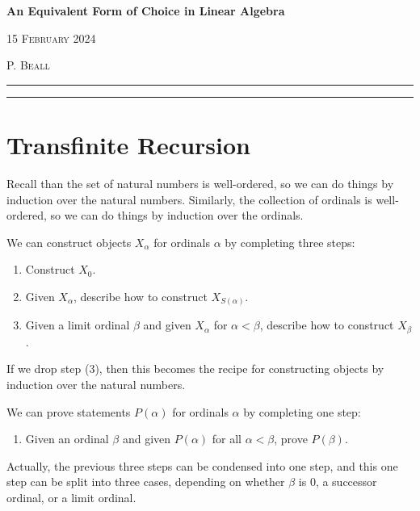 \documentclass[12pt]{article}
\theoremstyle{definition}
\begin{document}
\begin{center}
	\textbf{An Equivalent Form of Choice in Linear Algebra}
	
	\textsc{15 February 2024}
	
	\textsc{P. Beall}
\end{center}
\hrule
\begin{abstract}
	\noindent The Axiom of Choice is equivalent to the assertion that every vector space has a basis. First, we review transfinite recursion. Next, we use transfinite recursion and the Axiom of Choice to construct a basis for an arbitrary vector space. Conversely, we follow a non-obvious proof that the Axiom of Choice follows from the assertion that every vector space has a basis.
\end{abstract}
\hrule

\section*{Transfinite Recursion}

Recall than the set of natural numbers is well-ordered, so we can do things by induction over the natural numbers. Similarly, the collection of ordinals is well-ordered, so we can do things by induction over the ordinals.

We can construct objects $X_\alpha$ for ordinals $\alpha$ by completing three steps:
\begin{enumerate}[label=(\arabic*)]
	\item Construct $X_0$.
	\item Given $X_\alpha$, describe how to construct $X_{S(\alpha)}$.
	\item Given a limit ordinal $\beta$ and given $X_\alpha$ for $\alpha<\beta$, describe how to construct $X_\beta$.
\end{enumerate}
If we drop step (3), then this becomes the recipe for constructing objects by induction over the natural numbers.

We can prove statements $P(\alpha)$ for ordinals $\alpha$ by completing one step:
\begin{enumerate}[label=(\arabic*)]
	\item Given an ordinal $\beta$ and given $P(\alpha)$ for all $\alpha<\beta$, prove $P(\beta)$.
\end{enumerate}
Actually, the previous three steps can be condensed into one step, and this one step can be split into three cases, depending on whether $\beta$ is $0$, a successor ordinal, or a limit ordinal.
\end{document}
